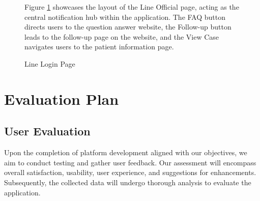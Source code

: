 \documentclass[12pt,oneside,openright,a4paper]{cpe-english-project}
\begin{document}
\begin{figure}[H]
\begin{minipage}{.3\textwidth}
      \end{minipage}%
    
      \caption{Line Login Page}\label{fig:Line_Login_Page}
      \begin{justify}
        \qquad Figure \ref{fig:Line_Login_Page} showcases the layout of the Line Official page, acting as the central notification hub within the application. The FAQ button directs users to the question answer website, the Follow-up button leads to the follow-up page on the website, and the View Case navigates users to the patient information page. \par
      \end{justify}
    \end{figure}
  \newpage
  \section{Evaluation Plan}
    \subsection{User Evaluation}
      \qquad Upon the completion of platform development aligned with our objectives, we aim to conduct testing and gather user feedback. Our assessment will encompass overall satisfaction, usability, user experience, and suggestions for enhancements. Subsequently, the collected data will undergo thorough analysis to evaluate the application. \par
\end{document}
